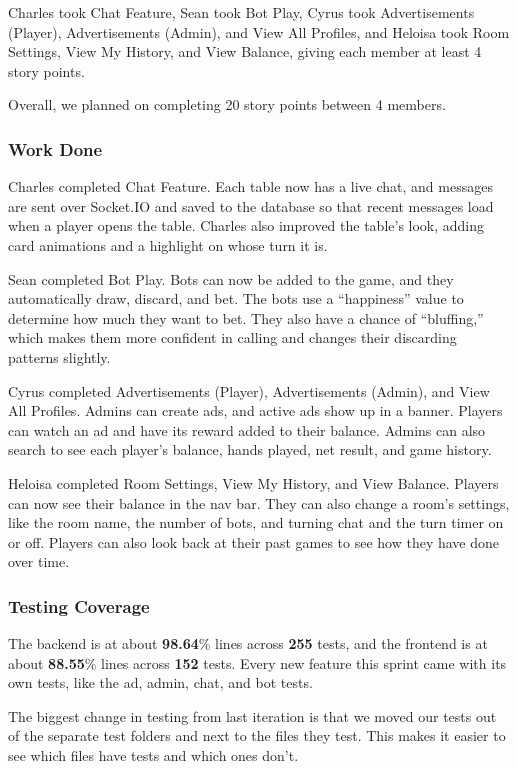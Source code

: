 \documentclass{article}
\begin{document}
Charles took Chat Feature, Sean took Bot Play, Cyrus took Advertisements (Player), Advertisements (Admin), and View All Profiles, and Heloisa took Room Settings, View My History, and View Balance, giving each member at least 4 story points.

Overall, we planned on completing 20 story points between 4 members.

\subsubsection{Work Done}
Charles completed Chat Feature. Each table now has a live chat, and messages are sent over Socket.IO and saved to the database so that recent messages load when a player opens the table. Charles also improved the table's look, adding card animations and a highlight on whose turn it is. 

Sean completed Bot Play. Bots can now be added to the game, and they automatically draw, discard, and bet. The bots use a ``happiness'' value to determine how much they want to bet. They also have a chance of ``bluffing,'' which makes them more confident in calling and changes their discarding patterns slightly.

Cyrus completed Advertisements (Player), Advertisements (Admin), and View All Profiles. Admins can create ads, and active ads show up in a banner. Players can watch an ad and have its reward added to their balance. Admins can also search to see each player's balance, hands played, net result, and game history.

Heloisa completed Room Settings, View My History, and View Balance. Players can now see their balance in the nav bar. They can also change a room's settings, like the room name, the number of bots, and turning chat and the turn timer on or off. Players can also look back at their past games to see how they have done over time.

\subsubsection{Testing Coverage}
The backend is at about \textbf{98.64}\% lines across \textbf{255} tests, and the frontend is at about \textbf{88.55}\% lines across \textbf{152} tests. Every new feature this sprint came with its own tests, like the ad, admin, chat, and bot tests.

The biggest change in testing from last iteration is that we moved our tests out of the separate test folders and next to the files they test. This makes it easier to see which files have tests and which ones don't.
\end{document}
